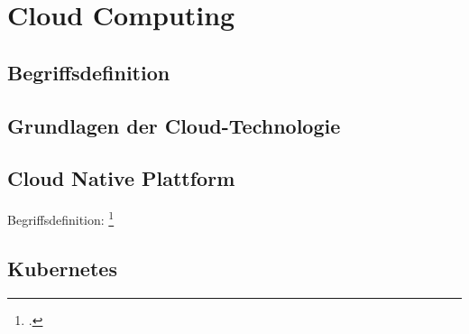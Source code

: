 \newpage
\section{Cloud Computing}
\subsection{Begriffsdefinition}
\subsection{Grundlagen der Cloud-Technologie}
\subsection{Cloud Native Plattform}
Begriffsdefinition: \footcite[Vgl.][S. 33-34]{kratzke2021cloud}
\subsection{Kubernetes}

